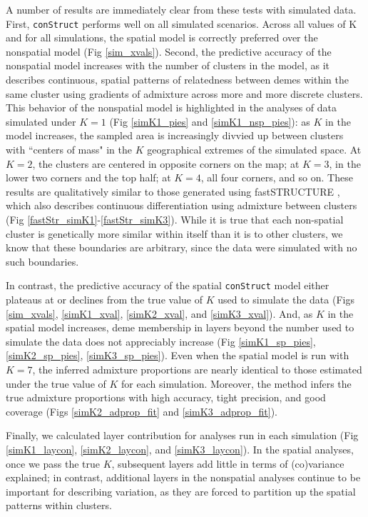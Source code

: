 \documentclass[12pt]{article}
\begin{document}
A number of results are immediately clear from these tests with simulated data.
First, \texttt{conStruct} performs well on all simulated scenarios.
Across all values of K and for all simulations, 
the spatial model is correctly preferred over the nonspatial model
(Fig \ref{sim_xvals}). Second, the predictive accuracy of the nonspatial model increases 
with the number of clusters in the model, 
as it describes continuous, spatial patterns of relatedness between demes within the same cluster 
using gradients of admixture across more and more discrete clusters.
This behavior of the nonspatial model is highlighted in 
the analyses of data simulated under $K=1$ (Fig \ref{simK1_pies} and \ref{simK1_nsp_pies}):
as $K$ in the model increases, 
the sampled area is increasingly divvied up between clusters 
with ``centers of mass" in the $K$ geographical extremes of the simulated space.
At $K=2$, the clusters are centered in opposite corners on the map; 
at $K=3$, in the lower two corners and the top half; 
at $K=4$, all four corners, and so on.
These results are qualitatively similar to those generated using fastSTRUCTURE \citep{fastStructure}, 
which also describes continuous differentiation using admixture between clusters
 (Fig \ref{fastStr_simK1}-\ref{fastStr_simK3}).
While it is true that each non-spatial cluster is genetically more similar within itself
than it is to other clusters,
we know that these boundaries are arbitrary,
since the data were simulated with no such boundaries.

In contrast, the predictive accuracy of the spatial \texttt{conStruct} model
either plateaus at or declines from the true value of $K$ used to simulate the data 
(Figs \ref{sim_xvals}, \ref{simK1_xval}, \ref{simK2_xval}, and \ref{simK3_xval}).
And, as $K$ in the spatial model increases, 
deme membership in layers beyond the number used to simulate the data does not appreciably increase 
(Fig \ref{simK1_sp_pies}, \ref{simK2_sp_pies}, \ref{simK3_sp_pies}).
Even when the spatial model is run with $K=7$, 
the inferred admixture proportions are nearly identical to 
those estimated under the true value of $K$ for each simulation.
Moreover, the method infers the true admixture proportions with high accuracy, tight precision, and good coverage 
(Figs \ref{simK2_adprop_fit} and \ref{simK3_adprop_fit}).

Finally, we calculated layer contribution for 
analyses run in each simulation 
(Fig \ref{simK1_laycon}, \ref{simK2_laycon}, and \ref{simK3_laycon}).
In the spatial analyses, once we pass the true $K$, 
subsequent layers add little in terms of (co)variance explained; 
in contrast, additional layers in the nonspatial analyses continue to
be important for describing variation, 
as they are forced to partition up the spatial patterns within clusters.
\end{document}
